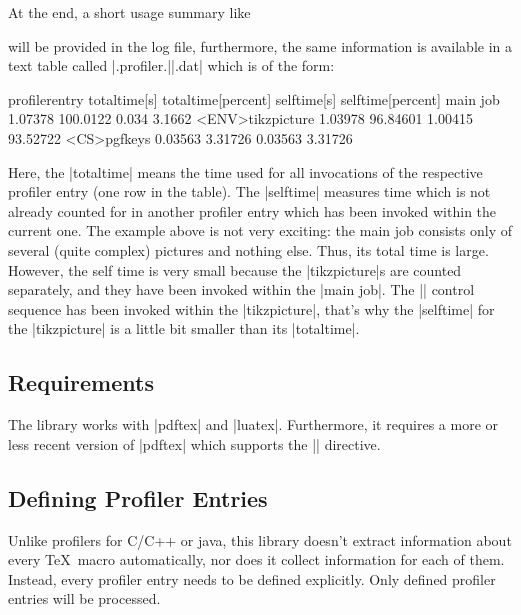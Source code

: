 At the end, a short usage summary like
\noindent will be provided in the log file, furthermore, the same information is available in a text table called |\jobname.profiler.||.dat| which is of the form:
\begin{codeexample}[code only, tikz syntax=false]
profilerentry       totaltime[s]        totaltime[percent]  selftime[s]         selftime[percent]   
main job            1.07378             100.0122            0.034               3.1662              
<ENV>tikzpicture    1.03978             96.84601            1.00415             93.52722            
<CS>pgfkeys         0.03563             3.31726             0.03563             3.31726             
\end{codeexample}
Here, the |totaltime| means the time used for all invocations of the respective profiler entry (one row in the table). The |selftime| measures time which is not already counted for in another profiler entry which has been invoked within the current one. The example above is not very exciting: the main job consists only of several (quite complex) pictures and nothing else. Thus, its total time is large. However, the self time is very small because the |tikzpicture|s are counted separately, and they have been invoked within the |main job|. The |\pgfkeys| control sequence has been invoked within the |tikzpicture|, that's why the |selftime| for the |tikzpicture| is a little bit smaller than its |totaltime|.

\subsection{Requirements}
The library works with |pdftex| and |luatex|. Furthermore, it requires
a more or less recent version of |pdftex| which supports the |\pdfelapsedtime| directive.

\subsection{Defining Profiler Entries}
Unlike profilers for C/C++ or java, this library doesn't extract information about every \TeX\ macro automatically, nor does it collect information for each of them. Instead, every profiler entry needs to be defined explicitly. Only defined profiler entries will be processed.

